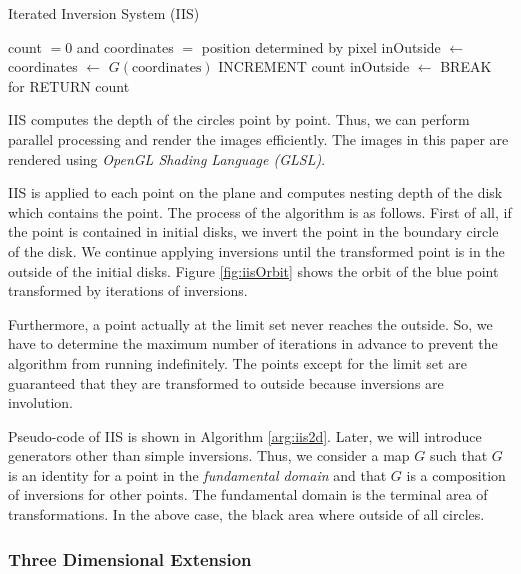  \begin{algorithm}
  \caption{Iterated Inversion System (IIS)}
  \label{arg:iis2d}
  \begin{algorithmic}
   \REQUIRE count $= 0$ and coordinates $=$ position determined by
   pixel
   \STATE inOutside $\leftarrow$ \TRUE
   \STATE coordinates $\leftarrow$ $G(\text{coordinates})$
   \STATE INCREMENT count
   \STATE inOutside $\leftarrow$ \FALSE
   \ENDIF
   \ENDFOR
   \STATE BREAK for
   \ENDIF
   \ENDFOR
   \STATE RETURN count
  \end{algorithmic}
 \end{algorithm}

\noindent IIS computes the depth of the circles point by point.
Thus, we can perform parallel processing and render the images efficiently.
The images in this paper are rendered using \textit{OpenGL Shading
Language (GLSL)}.

IIS is applied to each point on the plane and computes nesting depth of
the disk which contains the point.
The process of the algorithm is as follows.
First of all, if the point is contained in initial disks, we invert the
point in the boundary circle of the disk.
We continue applying inversions until the transformed point is in the
outside of the initial disks.
Figure \ref{fig:iisOrbit} shows the orbit of the blue point transformed by
iterations of inversions.

Furthermore, a point actually at the limit set never reaches the
outside. So, we have to determine the maximum number of iterations in
advance to prevent the algorithm from running indefinitely.
The points except for the limit set are guaranteed that they
are transformed to outside because inversions are involution.

Pseudo-code of IIS is shown in Algorithm \ref{arg:iis2d}.
Later, we will introduce generators other than simple inversions.
Thus, we consider a map $G$ such that $G$ is an identity for a point in the
\textit{fundamental domain} and that $G$ is a composition of inversions for other
points.
The fundamental domain is the terminal area of transformations. 
In the above case, the black area where outside of all circles.

\subsubsection{Three Dimensional Extension}


